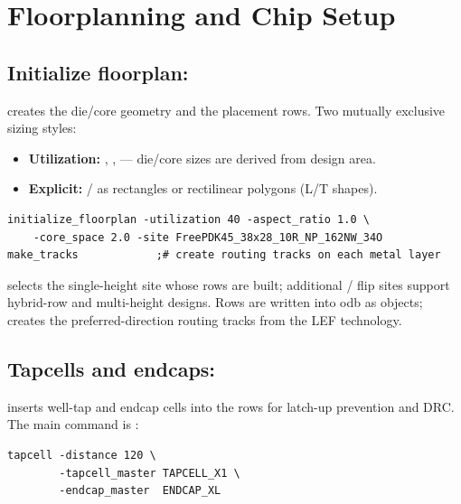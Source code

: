 \chapter{Floorplanning and Chip Setup}
\label{ch:floorplan}


\section{Initialize floorplan: }

 creates the die/core geometry and the placement rows.
Two mutually exclusive sizing styles:

\begin{itemize}
  \item \textbf{Utilization:} , ,
         --- die/core sizes are derived from design area.
  \item \textbf{Explicit:}  /  as rectangles
        or rectilinear polygons (L/T shapes).
\end{itemize}

\begin{lstlisting}[style=ortcl]
initialize_floorplan -utilization 40 -aspect_ratio 1.0 \
    -core_space 2.0 -site FreePDK45_38x28_10R_NP_162NW_34O
make_tracks            ;# create routing tracks on each metal layer
\end{lstlisting}

 selects the single-height site whose rows are built; additional /
flip sites support hybrid-row and multi-height designs. Rows are written into
odb as \id{dbRow} objects; \cmd{make\_tracks} creates the preferred-direction
routing tracks from the LEF technology.

\section{Tapcells and endcaps: }

 inserts well-tap and endcap cells into the rows for latch-up
prevention and DRC. The main command is \cmd{tapcell}:

\begin{lstlisting}[style=ortcl]
tapcell -distance 120 \
        -tapcell_master TAPCELL_X1 \
        -endcap_master  ENDCAP_XL
\end{lstlisting}

